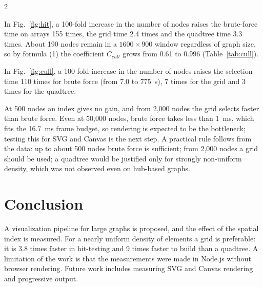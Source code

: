 \documentclass[a4paper,10pt,twoside]{article}
\begin{document}
\begin{multicols}{2}

In Fig.~\ref{fig:hit}, a 100-fold increase in the number of nodes raises the brute-force time on arrays 155 times, the grid time 2.4 times and the quadtree time 3.3 times. About 190 nodes remain in a $1600\times900$ window regardless of graph size, so by formula (1) the coefficient $C_{cull}$ grows from 0.61 to 0.996 (Table~\ref{tab:cull}).


In Fig.~\ref{fig:cull}, a 100-fold increase in the number of nodes raises the selection time 110 times for brute force (from 7.0 to 775~\textmu s), 7 times for the grid and 3 times for the quadtree.


At 500 nodes an index gives no gain, and from 2,000 nodes the grid selects faster than brute force. Even at 50,000 nodes, brute force takes less than 1~ms, which fits the 16.7~ms frame budget, so rendering is expected to be the bottleneck; testing this for SVG and Canvas is the next step. A practical rule follows from the data: up to about 500 nodes brute force is sufficient; from 2,000 nodes a grid should be used; a quadtree would be justified only for strongly non-uniform density, which was not observed even on hub-based graphs.

\section*{Conclusion}
A visualization pipeline for large graphs is proposed, and the effect of the spatial index is measured. For a nearly uniform density of elements a grid is preferable: it is 3.8 times faster in hit-testing and 9 times faster to build than a quadtree. A limitation of the work is that the measurements were made in Node.js without browser rendering. Future work includes measuring SVG and Canvas rendering and progressive output.


\end{multicols}
\end{document}
